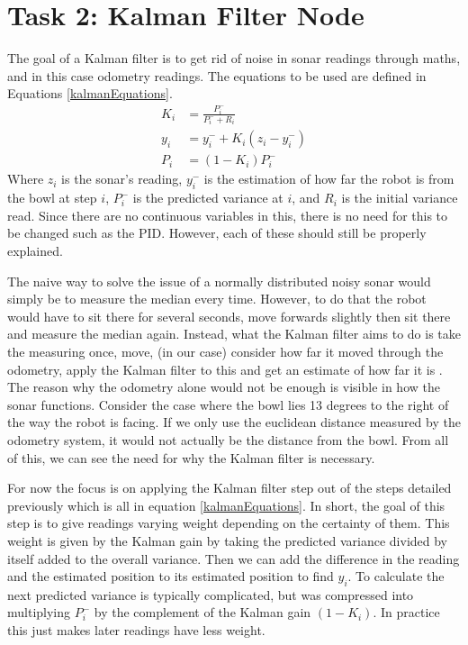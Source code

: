 \documentclass{article}
\newcommand\tab[1][1cm]{\hspace*{#1}}
\begin{document}
\section{Task 2: Kalman Filter Node}\label{kalmanSection}
The goal of a Kalman filter is to get rid of noise in sonar readings through
maths, and in this case odometry readings. The equations to be used are defined
in Equations \ref{kalmanEquations}.
\begin{equation}
    \label{kalmanEquations}
    \begin{split}
        K_i & = \frac{P_i^-}{P_i^- + R_i} \\
        y_i & = y_i^- + K_i(z_i - y_i^-) \\
        P_{i} & = (1-K_i)P_i^-
    \end{split}
\end{equation}
Where $z_i$ is the sonar's reading, $y_i^-$ is the estimation of how far the
robot is from the bowl at step $i$, $P_i^-$ is the predicted variance at $i$,
and $R_i$ is the initial variance read. Since there are no continuous variables
in this, there is no need for this to be changed such as the PID. However, each
of these should still be properly explained.

\tab The naive way to solve the issue of a normally distributed noisy sonar
would simply be to measure the median every time. However, to do that the robot
would have to sit there for several seconds, move forwards slightly then sit
there and measure the median again. Instead, what the Kalman filter aims to do is
take the measuring once, move, (in our case) consider how far it moved through
the odometry, apply the Kalman filter to this and get an estimate of how far it
is \cite{kalman}. The reason why the odometry alone would not be enough is visible in how the
sonar functions. Consider the case where the bowl lies 13 degrees to the right
of the way the robot is facing. If we only use the euclidean distance measured
by the odometry system, it would not actually be the distance from the bowl.
From all of this, we can see the need for why the Kalman filter is necessary.

\tab For now the focus is on applying the Kalman filter step out of the steps
detailed previously which is all in equation \ref{kalmanEquations}. In short,
the goal of this step is to give readings varying weight depending on the
certainty of them. This weight is given by the Kalman gain by taking the
predicted variance divided by itself added to the overall variance. Then we can
add the difference in the reading and the estimated position to its estimated
position to find $y_i$. To calculate the next predicted variance is typically
complicated, but was compressed into multiplying $P_i^-$ by the complement of
the Kalman gain $(1-K_i)$. In practice this just makes later readings have less
weight.
\end{document}
